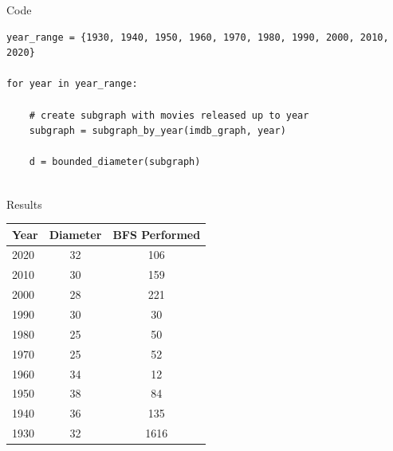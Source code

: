 \begin{frame}[fragile]{Code}
\begin{lstlisting}
year_range = {1930, 1940, 1950, 1960, 1970, 1980, 1990, 2000, 2010, 2020}

for year in year_range:

    # create subgraph with movies released up to year
    subgraph = subgraph_by_year(imdb_graph, year)
    
    d = bounded_diameter(subgraph)
    
\end{lstlisting}
\end{frame}
\begin{frame}{Results}
\centering
\begin{tabular}{|l|c|c|}
    \hline
     Year & Diameter & BFS Performed\\
     \hline \hline
     2020 & 32 & 106\\
     2010 & 30 & 159\\
     2000 & 28 & 221\\ 
     1990 & 30 & 30\\
     1980 & 25 & 50\\ 
     1970 & 25 & 52\\ 
     1960 & 34 & 12\\
     1950 & 38 & 84\\
     1940 & 36 & 135 \\
     1930 & 32 & 1616\\
     \hline
\end{tabular}
\end{frame}
